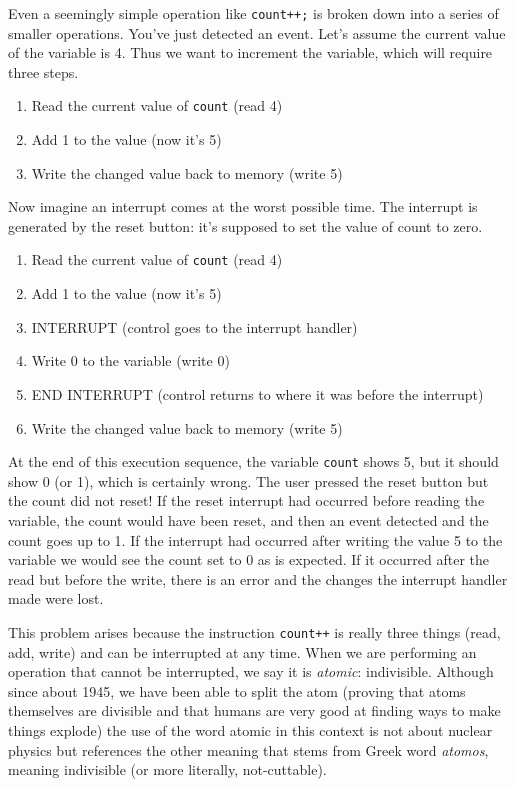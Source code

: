 Even a seemingly simple operation like \texttt{count++;} is broken down into a series of smaller operations. You've just detected an event. Let's assume the current value of the variable is 4. Thus we want to increment the variable, which will require three steps.

\begin{enumerate}
	\item Read the current value of \texttt{count} (read 4)
	\item Add 1 to the value (now it's 5)
	\item Write the changed value back to memory (write 5)
\end{enumerate}

Now imagine an interrupt comes at the worst possible time. The interrupt is generated by the reset button: it's supposed to set the value of count to zero.

\begin{enumerate}
	\item Read the current value of \texttt{count} (read 4)
	\item Add 1 to the value (now it's 5)
	\item INTERRUPT (control goes to the interrupt handler)
	\item Write 0 to the variable (write 0)
	\item END INTERRUPT (control returns to where it was before the interrupt)
	\item Write the changed value back to memory (write 5)
\end{enumerate}

At the end of this execution sequence, the variable \texttt{count} shows 5, but it should show 0 (or 1), which is certainly wrong. The user pressed the reset button but the count did not reset! If the reset interrupt had occurred before reading the variable, the count would have been reset, and then an event detected and the count goes up to 1. If the interrupt had occurred after writing the value 5 to the variable we would see the count set to 0 as is expected. If it occurred after the read but before the write, there is an error and the changes the interrupt handler made were lost.

This problem arises because the instruction \texttt{count++} is really three things (read, add, write) and can be interrupted at any time. When we are performing an operation that cannot be interrupted, we say it is \textit{atomic}: indivisible. Although since about 1945, we have been able to split the atom (proving that atoms themselves are divisible and that humans are very good at finding ways to make things explode) the use of the word atomic in this context is not about nuclear physics but references the other meaning that stems from Greek word \textit{atomos}, meaning indivisible (or more literally, not-cuttable).

